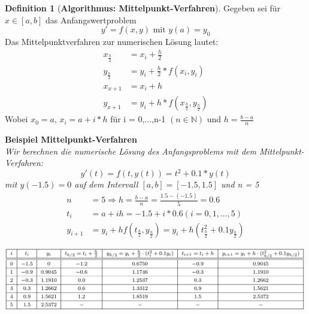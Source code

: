 \documentclass{article}
\newenvironment{Figure}
	{\par\medskip\noindent\minipage{\linewidth}}
	{\endminipage\par\medskip}
\theoremstyle{satz}
\theoremstyle{definition}
\newtheorem{definition}{Definition}
\begin{document}
\begin{tcolorbox}
\begin{definition}[\textbf{Algorithmus: Mittelpunkt-Verfahren}]
Gegeben sei für $x \in [a,b]$ das Anfangswertproblem
\begin{equation}
y' = f(x,y)  \textrm{ mit } y(a) = y_0
\end{equation}
Das Mittelpunktverfahren zur numerischen Lösung lautet:
\begin{equation}
\begin{split}
x_{\frac{h}{2}} &= x_i + \frac{h}{2}\\
y_{\frac{h}{2}} &= y_i + \frac{h}{2}*f(x_i, y_i)\\
x_{x+1} &= x_i + h\\
y_{x+1} &= y_i + h*f(x_{\frac{h}{2}},y_{\frac{h}{2}})
\end{split}
\end{equation}
Wobei $x_0 = a$, $x_i = a+i*h$ für i = 0,...,n-1 $(n \in \mathbb{N})$ und $h = \frac{b-a}{n}$
\end{definition}
\end{tcolorbox}
\textbf{Beispiel Mittelpunkt-Verfahren}\\
\textit{Wir berechnen die numerische Lösung des Anfangsproblems mit dem Mittelpunkt-Verfahren:
\begin{equation}
y'(t) = f(t,y(t)) = t^2+0.1*y(t)
\end{equation}
mit $y(-1.5)=0$ auf dem Intervall $[a,b] = [-1.5, 1.5]$ und n = 5
}
\begin{equation}
\begin{split}
n &= 5 \Rightarrow h = \frac{b-a}{n} = \frac{1.5-(-1.5)}{5} = 0.6\\
t_i &= a +ih = -1.5 + i*0.6   (i = 0, 1,..., 5)\\
y_{i+1} &= y_i + hf(t_{\frac{h}{2}},y_{\frac{h}{2}}) = y_i + h(t^2_{\frac{h}{2}} + 0.1y_{\frac{h}{2}})
\end{split}
\end{equation}
\begin{Figure}
\centering
\includegraphics[width=500px]{img/MittelwertVerfahrenBeispiel.png}
	\label{fig:Tabelle für das Mittelpunkt-Verfahren}
\end{Figure}
\end{document}

